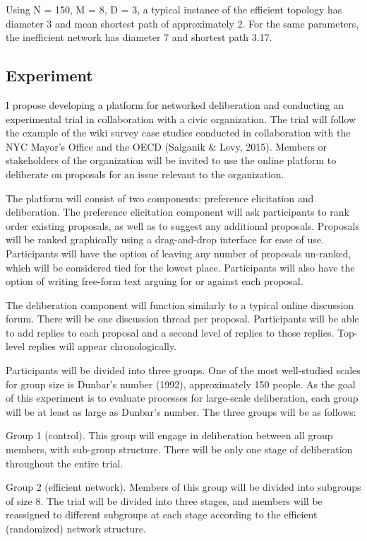 Using N = 150, M = 8, D = 3, a typical instance of the efficient topology has diameter 3 and mean shortest path of approximately 2. For the same parameters, the inefficient network has diameter 7 and shortest path 3.17.

\subsection{Experiment}
I propose developing a platform for networked deliberation and conducting an experimental trial in collaboration with a civic organization. The trial will follow the example of the wiki survey case studies conducted in collaboration with the NYC Mayor’s Office and the OECD (Salganik \& Levy, 2015). Members or stakeholders of the organization will be invited to use the online platform to deliberate on proposals for an issue relevant to the organization.

The platform will consist of two components: preference elicitation and deliberation. The preference elicitation component will ask participants to rank order existing proposals, as well as to suggest any additional proposals. Proposals will be ranked graphically using a drag-and-drop interface for ease of use. Participants will have the option of leaving any number of proposals un-ranked, which will be considered tied for the lowest place. Participants will also have the option of writing free-form text arguing for or against each proposal.

The deliberation component will function similarly to a typical online discussion forum. There will be one discussion thread per proposal. Participants will be able to add replies to each proposal and a second level of replies to those replies. Top-level replies will appear chronologically.

Participants will be divided into three groups. One of the most well-studied scales for group size is Dunbar’s number (1992), approximately 150 people. As the goal of this experiment is to evaluate processes for large-scale deliberation, each group will be at least as large as Dunbar’s number. The three groups will be as follows:

Group 1 (control). This group will engage in deliberation between all group members, with sub-group structure. There will be only one stage of deliberation throughout the entire trial.

Group 2 (efficient network). Members of this group will be divided into subgroups of size 8. The trial will be divided into three stages, and members will be reassigned to different subgroups at each stage according to the efficient (randomized) network structure.

